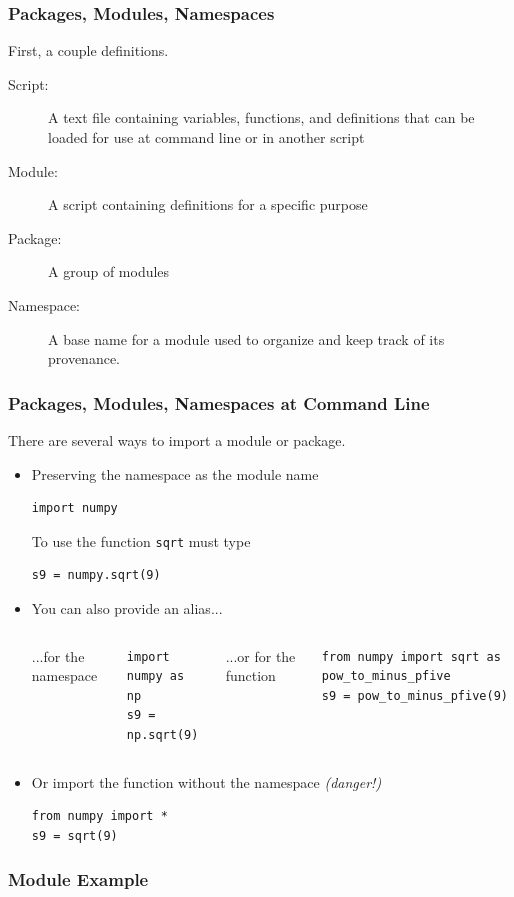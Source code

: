 \documentclass{beamer}
\begin{document}
\begin{frame}[fragile]
\frametitle{Packages, Modules, Namespaces}
First, a couple definitions.
\begin{description}
\item[Script:] A text file containing variables, functions, and definitions that can be 
 loaded for use at command line or in another script
\item[Module:] A script containing definitions for a specific purpose
\item[Package:] A group of modules
\item[Namespace:] A base name for a module used to organize and keep track of its provenance.
\end{description}
\end{frame}

\begin{frame}[fragile]
\frametitle{Packages, Modules, Namespaces at Command Line}
There are several ways to import a module or package.
\begin{itemize}
\pause
\item Preserving the namespace as the module name
\begin{lstlisting}
import numpy
\end{lstlisting}
To use the function \texttt{sqrt} must type
\begin{lstlisting}
s9 = numpy.sqrt(9)
\end{lstlisting}
\pause
\item {You can also provide an alias...}
\begin{columns}[c]
\column{3.5cm}
...for the namespace
\begin{lstlisting}
import numpy as np
s9 = np.sqrt(9)
\end{lstlisting}
\column{4.5cm}
...or for the function
\begin{lstlisting}
from numpy import sqrt as pow_to_minus_pfive
s9 = pow_to_minus_pfive(9)
\end{lstlisting}
\end{columns}
\pause
\item Or import the function without the namespace \emph{(danger!)}
\begin{lstlisting}
from numpy import *
s9 = sqrt(9)
\end{lstlisting}
\end{itemize}
\end{frame}

\begin{frame}[fragile]
\frametitle{Module Example}

\end{frame}
\end{document}
